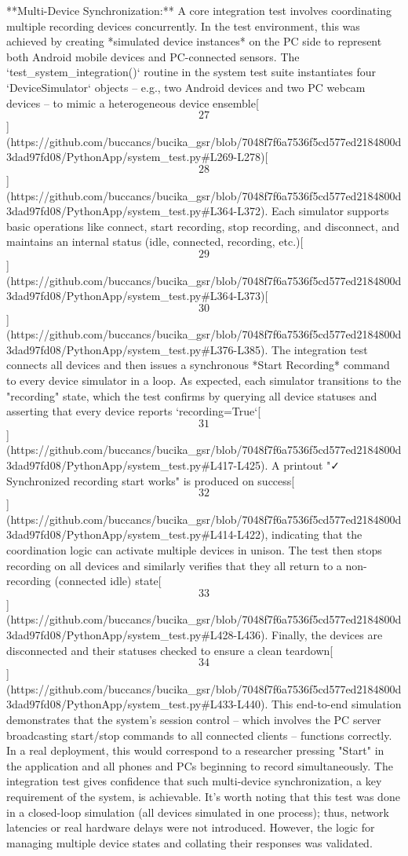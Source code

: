 \documentclass[12pt,a4paper]{article}
\begin{document}
{**Multi-Device Synchronization:** A core integration test involves
coordinating multiple recording devices concurrently. In the test
environment, this was achieved by creating *simulated device instances*
on the PC side to represent both Android mobile devices and PC-connected
sensors. The `test_system_integration()` routine in the system test
suite instantiates four `DeviceSimulator` objects -- e.g., two Android
devices and two PC webcam devices -- to mimic a heterogeneous device
ensemble[\[27\]](https://github.com/buccancs/bucika_gsr/blob/7048f7f6a7536f5cd577ed2184800d3dad97fd08/PythonApp/system_test.py#L269-L278)[\[28\]](https://github.com/buccancs/bucika_gsr/blob/7048f7f6a7536f5cd577ed2184800d3dad97fd08/PythonApp/system_test.py#L364-L372).
Each simulator supports basic operations like connect, start recording,
stop recording, and disconnect, and maintains an internal status (idle,
connected, recording,
etc.)[\[29\]](https://github.com/buccancs/bucika_gsr/blob/7048f7f6a7536f5cd577ed2184800d3dad97fd08/PythonApp/system_test.py#L364-L373)[\[30\]](https://github.com/buccancs/bucika_gsr/blob/7048f7f6a7536f5cd577ed2184800d3dad97fd08/PythonApp/system_test.py#L376-L385).
The integration test connects all devices and then issues a synchronous
*Start Recording* command to every device simulator in a loop. As
expected, each simulator transitions to the "recording" state, which the
test confirms by querying all device statuses and asserting that every
device reports
`recording=True`[\[31\]](https://github.com/buccancs/bucika_gsr/blob/7048f7f6a7536f5cd577ed2184800d3dad97fd08/PythonApp/system_test.py#L417-L425).
A printout "✓ Synchronized recording start works" is produced on
success[\[32\]](https://github.com/buccancs/bucika_gsr/blob/7048f7f6a7536f5cd577ed2184800d3dad97fd08/PythonApp/system_test.py#L414-L422),
indicating that the coordination logic can activate multiple devices in
unison. The test then stops recording on all devices and similarly
verifies that they all return to a non-recording (connected idle)
state[\[33\]](https://github.com/buccancs/bucika_gsr/blob/7048f7f6a7536f5cd577ed2184800d3dad97fd08/PythonApp/system_test.py#L428-L436).
Finally, the devices are disconnected and their statuses checked to
ensure a clean
teardown[\[34\]](https://github.com/buccancs/bucika_gsr/blob/7048f7f6a7536f5cd577ed2184800d3dad97fd08/PythonApp/system_test.py#L433-L440).
This end-to-end simulation demonstrates that the system's session
control -- which involves the PC server broadcasting start/stop commands
to all connected clients -- functions correctly. In a real deployment,
this would correspond to a researcher pressing "Start" in the
application and all phones and PCs beginning to record simultaneously.
The integration test gives confidence that such multi-device
synchronization, a key requirement of the system, is achievable. It's
worth noting that this test was done in a closed-loop simulation (all
devices simulated in one process); thus, network latencies or real
hardware delays were not introduced. However, the logic for managing
multiple device states and collating their responses was validated.

}
\end{document}
